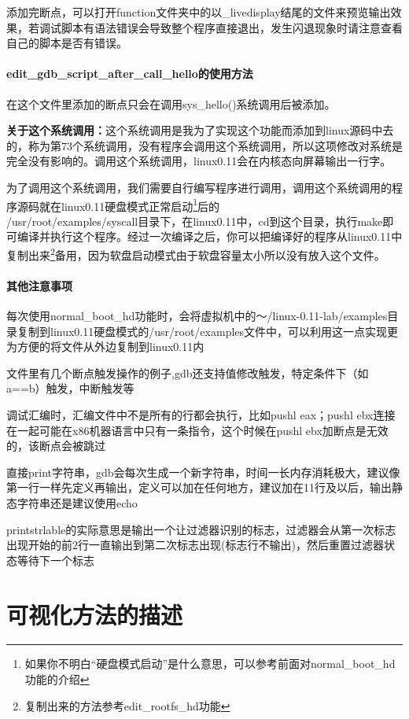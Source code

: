 \documentclass[]{report}
\begin{document}
添加完断点，可以打开function文件夹中的以\_livedisplay结尾的文件来预览输出效果，若调试脚本有语法错误会导致整个程序直接退出，发生闪退现象时请注意查看自己的脚本是否有错误。

\subsubsection{edit\_gdb\_script\_after\_call\_hello的使用方法}

在这个文件里添加的断点只会在调用sys\_hello()系统调用后被添加。

\textbf{关于这个系统调用：}\quad 这个系统调用是我为了实现这个功能而添加到linux源码中去的，称为第73个系统调用，没有程序会调用这个系统调用，所以这项修改对系统是完全没有影响的。调用这个系统调用，linux0.11会在内核态向屏幕输出一行字。

为了调用这个系统调用，我们需要自行编写程序进行调用，调用这个系统调用的程序源码就在linux0.11硬盘模式正常启动\footnote{如果你不明白“硬盘模式启动”是什么意思，可以参考前面对normal\_boot\_hd功能的介绍}后的\\/usr/root/examples/syscall目录下，在linux0.11中，cd到这个目录，执行make即可编译并执行这个程序。经过一次编译之后，你可以把编译好的程序从linux0.11中复制出来\footnote{复制出来的方法参考edit\_rootfs\_hd功能}备用，因为软盘启动模式由于软盘容量太小所以没有放入这个文件。

\subsubsection{其他注意事项}

每次使用normal\_boot\_hd功能时，会将虚拟机中的～/linux-0.11-lab/examples目录复制到linux0.11硬盘模式的/usr/root/examples文件中，可以利用这一点实现更为方便的将文件从外边复制到linux0.11内

文件里有几个断点触发操作的例子,gdb还支持值修改触发，特定条件下（如a==b）触发，中断触发等

调试汇编时，汇编文件中不是所有的行都会执行，比如pushl eax；pushl ebx连接在一起可能在x86机器语言中只有一条指令，这个时候在pushl ebx加断点是无效的，该断点会被跳过

直接print字符串，gdb会每次生成一个新字符串，时间一长内存消耗极大，建议像第一行一样先定义再输出，定义可以加在任何地方，建议加在11行及以后，输出静态字符串还是建议使用echo

printstrlable的实际意思是输出一个让过滤器识别的标志，过滤器会从第一次标志出现开始的前2行一直输出到第二次标志出现(标志行不输出)，然后重置过滤器状态等待下一个标志

\chapter{可视化方法的描述}
\end{document}
